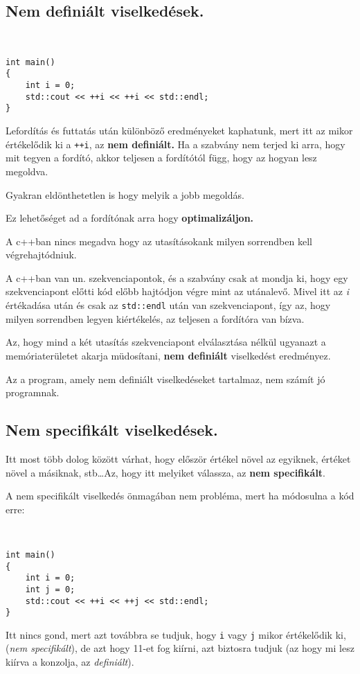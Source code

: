 \documentclass[a4paper,11.5pt]{article}
\begin{document}
	\subsection{Nem definiált viselkedések.}
	\begin{example}\ 
		
		\begin{lstlisting}
int main()
{
	int i = 0;
	std::cout << ++i << ++i << std::endl;
}
		\end{lstlisting}
		
		Lefordítás és futtatás után különböző eredményeket kaphatunk, mert itt az mikor értékelődik ki a \texttt{++i}, az \textbf{nem definiált.} Ha a szabvány nem terjed ki arra, hogy mit tegyen a fordító, akkor teljesen a fordítótól függ, hogy az hogyan lesz megoldva. 
		
		\medskip
		Gyakran eldönthetetlen is hogy melyik a jobb megoldás.
		
		\medskip
		Ez lehetőséget ad a fordítónak arra hogy \textbf{optimalizáljon.} 
	\end{example}
	
	A c++ban nincs megadva hogy az utasításokank milyen sorrendben kell végrehajtódniuk.
	
	\medskip
	A c++ban van un. szekvenciapontok, és a szabvány csak at mondja ki, hogy egy szekvenciapont előtti kód előbb hajtódjon végre mint az utánalevő.  Mivel itt az \textit{i} értékadása után és csak az \texttt{std::endl} után van szekvenciapont, így az, hogy milyen sorrendben legyen kiértékelés, az teljesen a fordítóra van bízva.
	
	\medskip
	Az, hogy mind a két utasítás szekvenciapont elválasztása nélkül ugyanazt a memóriaterületet akarja müdosítani, \textbf{nem definiált} viselkedést eredményez.
	\begin{note}
		Az a program, amely nem definiált viselkedéseket tartalmaz, nem számít jó programnak.
	\end{note}
	\subsection{Nem specifikált viselkedések.}
	Itt most több dolog között várhat, hogy először értékel növel az egyiknek, értéket növel a másiknak, stb\ldots Az, hogy itt melyiket válassza, az \textbf{nem specifikált}.
	
	A nem specifikált viselkedés önmagában nem probléma, mert ha módosulna a kód erre:
	
	\begin{example}\ 
		
		\begin{lstlisting}
int main()
{
	int i = 0;
	int j = 0;
	std::cout << ++i << ++j << std::endl;
}
		\end{lstlisting}
	\end{example}
	Itt nincs gond, mert azt továbbra se tudjuk, hogy \texttt{i} vagy \texttt{j} mikor értékelődik ki, (\textit{nem specifikált}), de azt hogy 11-et fog kiírni, azt biztosra tudjuk (az hogy mi lesz kiírva a konzolja, az \textit{definiált}).
	
\end{document}
